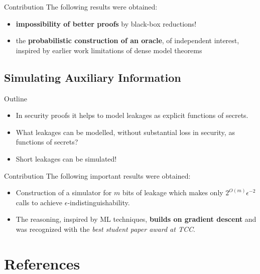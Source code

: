 \documentclass[9pt]{beamer}					%
\begin{document}
\begin{frame}{Contribution}
The following results were obtained:
\begin{itemize}
    \item[\emoji{key}] \textbf{impossibility of better proofs} by black-box reductions!
    \item[\emoji{key}] the \textbf{probabilistic construction of an oracle}, of independent interest, inspired by earlier work limitations of dense model theorems~\cite{DBLP:journals/eccc/Zhang11}
\end{itemize}
\end{frame}

\subsection{Simulating Auxiliary Information }

\begin{frame}{Outline}
\begin{itemize}
\item[\emoji{open-book}] In security proofs it helps to model leakages as explicit functions of secrets.
\item[\emoji{question}] What leakages can be modelled, without substantial loss in security, as functions of secrets?
\item[\emoji{raised-hand}] Short leakages can be simulated!
\end{itemize}
\end{frame}

\begin{frame}{Contribution}
The following important results were obtained:
\begin{itemize}
\item[\emoji{key}] Construction of a simulator for $m$ bits of leakage which makes only $2^{O(m)}\epsilon^{-2}$ calls to achieve $\epsilon$-indistinguishability.
\item[\emoji{trophy}] The reasoning, inspired by ML techniques, \textbf{builds on gradient descent} and was recognized with the \emph{best student paper award at TCC}.
\end{itemize}
\end{frame}



%

\section{References }
\end{document}
